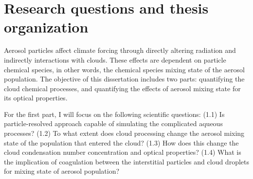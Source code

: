 \documentclass[edeposit,fullpage]{uiucthesis2009}
\begin{document}
\section{Research questions and thesis organization}
Aerosol particles affect climate forcing through directly altering radiation and indirectly interactions with clouds. These effects are dependent on particle chemical species, in other words, the chemical species mixing state of the aerosol population. The objective of this dissertation includes two parts: quantifying the cloud chemical processes, and quantifying the effects of aerosol mixing state for its optical properties.

For the first part, I will focus on the following scientific questions: (1.1) Is particle-resolved approach capable of simulating the complicated aqueous processes? (1.2) To what extent does cloud processing change the aerosol mixing state of the population that entered the cloud?  (1.3) How does this change the cloud condensation number concentration and optical properties? (1.4) What is the implication of coagulation between the interstitial particles and cloud droplets for mixing state of aerosol population? 
\end{document}
